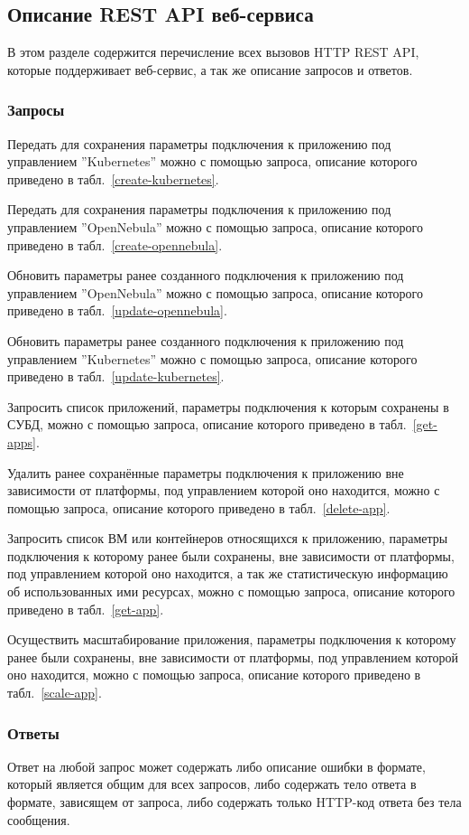 \subsection{Описание REST API веб-сервиса}
В этом разделе содержится перечисление всех вызовов HTTP REST API, которые поддерживает веб-сервис, а так же описание запросов и ответов.

\subsubsection*{Запросы}
Передать для сохранения параметры подключения к приложению под управлением ''Kubernetes'' можно с помощью запроса, описание которого приведено в табл.~\ref{create-kubernetes}.

Передать для сохранения параметры подключения к приложению под управлением ''OpenNebula'' можно с помощью запроса, описание которого приведено в табл.~\ref{create-opennebula}.

Обновить параметры ранее созданного подключения к приложению под управлением ''OpenNebula'' можно с помощью запроса, описание которого приведено в табл.~\ref{update-opennebula}.

Обновить параметры ранее созданного подключения к приложению под управлением ''Kubernetes'' можно с помощью запроса, описание которого приведено в табл.~\ref{update-kubernetes}.

Запросить список приложений, параметры подключения к которым сохранены в СУБД, можно с помощью запроса, описание которого приведено в табл.~\ref{get-apps}.

Удалить ранее сохранённые параметры подключения к приложению вне зависимости от платформы, под управлением которой оно находится, можно с помощью запроса, описание которого приведено в табл.~\ref{delete-app}.

Запросить список ВМ или контейнеров относящихся к приложению, параметры подключения к которому ранее были сохранены, вне зависимости от платформы, под управлением которой оно находится, а так же статистическую информацию об использованных ими ресурсах, можно с помощью запроса, описание которого приведено в табл.~\ref{get-app}.

Осуществить масштабирование приложения, параметры подключения к которому ранее были сохранены, вне зависимости от платформы, под управлением которой оно находится, можно с помощью запроса, описание которого приведено в табл.~\ref{scale-app}.

\subsubsection*{Ответы}
Ответ на любой запрос может содержать либо описание ошибки в формате, который является общим для всех запросов, либо содержать тело ответа в формате, зависящем от запроса, либо содержать только HTTP-код ответа без тела сообщения.


